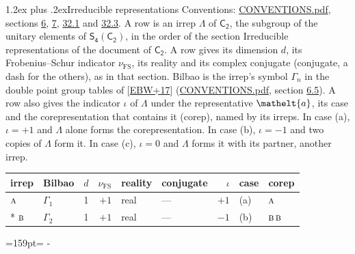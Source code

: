 \documentclass[10pt,a4paper]{article}
\makeatletter
\renewcommand\section{\@startsection{section}{1}{\z@}{-3ex plus -1ex minus -.2ex}%
  {1.2ex plus .2ex}{\normalfont\large\sffamily\bfseries\color{parttitle}}}
\newcommand{\needspace}[1]{\par\penalty-100\begingroup\dimen0=#1\relax\dimen2=\pagegoal
  \advance\dimen2-\pagetotal\ifdim\dimen0>\dimen2\relax\ifdim\dimen2>0pt\vfil\break\fi\fi
  \endgroup}
\numberwithin{equation}{section}
\newcommand{\eltfont}[1]{{\let\sigma\eltsigma\mathelt{#1}}}
\newcommand{\grp}[1]{\mathsf{#1}}
\newcommand{\irr}[1]{\text{\normalfont\scshape #1}}
\newcommand{\elt}[1]{\eltfont{#1}}
\newcommand{\fsind}{\nu_{\mathrm{FS}}}
\makeatother
\begin{document}
\section{Irreducible representations}\label{s:irreps}
Conventions: \href{../../CONVENTIONS.pdf}{CONVENTIONS.pdf}, sections \href{../../../rotation/CONVENTIONS.pdf\#conv.6}{6}, \href{../../../rotation/CONVENTIONS.pdf\#conv.7}{7}, \href{../../CONVENTIONS.pdf\#conv.32.1}{32.1} and \href{../../CONVENTIONS.pdf\#conv.32.3}{32.3}.
\leavevmode\label{n:irrep.Delta}A row is an irrep $\Lambda$ of $\grp{C_{2}}$, the subgroup of the unitary elements of $\grp{S_{4}}(\grp{C_{2}})$, in the order of the section Irreducible representations of the document of \href{../../../rotation/data/pdf/C2.pdf}{$\grp{C_{2}}$}. \label{n:index.dimension}\label{n:index.frobenius}\label{n:head.irrep}\label{n:head.reality}\label{n:head.conjugate}A row gives its dimension $d$, its Frobenius--Schur indicator $\fsind$, its reality and its complex conjugate (conjugate, a dash for the others), as in that section. \label{n:head.bilbao}\label{n:irrep.alias.gamma}Bilbao is the irrep's symbol $\Gamma_n$ in the double point group tables of [\href{../../../REFERENCES.pdf\#ref.EBW+17}{EBW+17}] (\href{../../CONVENTIONS.pdf}{CONVENTIONS.pdf}, section \href{../../../rotation/CONVENTIONS.pdf\#conv.6.5}{6.5}). \label{n:head.case.corep}\label{n:head.corep}A row also gives the indicator $\iota$ of $\Lambda$ under the representative $\elt{a}$, its case and the corepresentation that contains it (corep), named by its irreps. In case (a), $\iota = +1$ and $\Lambda$ alone forms the corepresentation. In case (b), $\iota = -1$ and two copies of $\Lambda$ form it. In case (c), $\iota = 0$ and $\Lambda$ forms it with its partner, another irrep.
\setlength{\emergencystretch}{2em}\par\setlength{\emergencystretch}{0pt}
{\small\renewcommand{\arraystretch}{1.25}\setlength{\tabcolsep}{4pt}\begin{longtable}{@{}llrrllrll@{}}\toprule
irrep & Bilbao & $d$ & $\fsind$ & reality & conjugate & $\iota$ & case & corep\\\midrule\endhead
\bottomrule\endfoot\endlastfoot
$\irr{a}$ & $\Gamma_{1}$ & 1 & $+1$ & real & --- & $+1$ & (a) & $\irr{a}$\\*
$\irr{b}$ & $\Gamma_{2}$ & 1 & $+1$ & real & --- & $-1$ & (b) & $\irr{b}\,\irr{b}$\\
\bottomrule\end{longtable}}
\needspace{159pt}
\end{document}
